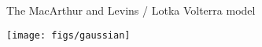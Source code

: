 \documentclass[12pt]{beamer}
\newcommand{\ud}{\mathrm{d}}
\begin{document}

\begin{frame}{The MacArthur and Levins / Lotka Volterra model}
  \begin{center}
    \texttt{[image: figs/gaussian]}
  \end{center}
\end{frame}

  

  
\end{document}
